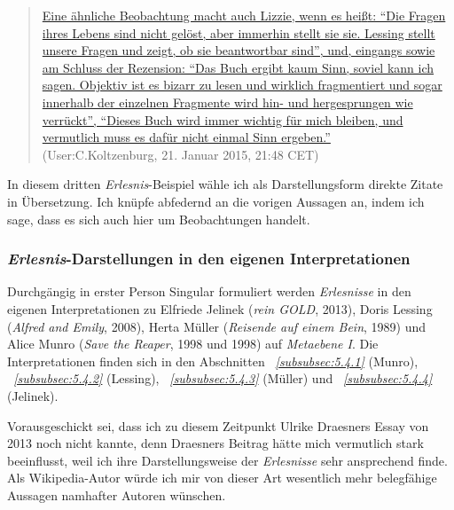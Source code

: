 \documentclass[fontsize=12pt]{scrartcl}
\begin{document}
\singlespacing 
\begin{quote}
\href{https://de.wikipedia.org/w/index.php?title=Alfred_und_Emily&oldid=138028858#Leseerlebnis}{Eine \"ahnliche Beobachtung macht auch Lizzie, wenn es hei{\ss}t: "`Die Fragen ihres Lebens sind nicht gel\"ost, aber immerhin stellt sie sie. Lessing stellt unsere Fragen und zeigt, ob sie beantwortbar sind"', und, eingangs sowie am Schluss der Rezension: "`Das Buch ergibt kaum Sinn, soviel kann ich sagen. Objektiv ist es bizarr zu lesen und wirklich fragmentiert und sogar innerhalb der einzelnen Fragmente wird hin- und hergesprungen wie verr\"uckt"', "`Dieses Buch wird immer wichtig f\"ur mich bleiben, und vermutlich muss es daf\"ur nicht einmal Sinn ergeben."'}\\ (User:C.Koltzenburg, 21. Januar 2015, 21:48 CET)
\end{quote}
\onehalfspacing

In diesem dritten \textit{Erlesnis}-Beispiel w\"ahle ich als Darstellungsform direkte Zitate in \"Ubersetzung. Ich kn\"upfe abfedernd an die vorigen Aussagen an, indem ich sage, dass es sich auch \mbox{hier} um Beobachtungen handelt.

\pagebreak
\subsubsection{\textit{Erlesnis}-Darstellungen in den eigenen Interpretationen}
\label{subsubsec:7.1.4}

Durchg\"angig in erster Person Singular formuliert werden \textit{Erlesnisse} in den eigenen Interpretationen zu Elfriede Jelinek (\textit{rein GOLD}, 2013), Doris Lessing (\textit{Alfred and Emily}, 2008), Herta M\"uller (\textit{Reisende auf einem Bein}, 1989) und Alice Munro (\textit{Save the Reaper}, 1998 und 1998) auf \textit{Metaebene I}. Die Interpretationen finden sich in den Abschnitten \textit{~\ref{subsubsec:5.4.1}} (Munro), \textit{~\ref{subsubsec:5.4.2}} (Lessing), \textit{~\ref{subsubsec:5.4.3}} (M\"uller) und \textit{~\ref{subsubsec:5.4.4}} (Jelinek).

Vorausgeschickt sei, dass ich zu diesem Zeitpunkt Ulrike Draesners Essay von 2013 noch nicht kannte, denn Draesners Beitrag h\"atte mich vermutlich stark beeinflusst, weil ich ihre Darstellungsweise der \textit{Erlesnisse} sehr ansprechend finde. Als Wi\-ki\-pe\-dia-Autor\textsuperscript{\tiny *} w\"urde ich mir von dieser Art we\-sent\-lich mehr belegf\"ahige Aussagen namhafter Autoren\textsuperscript{\tiny *} w\"unschen.
\end{document}
